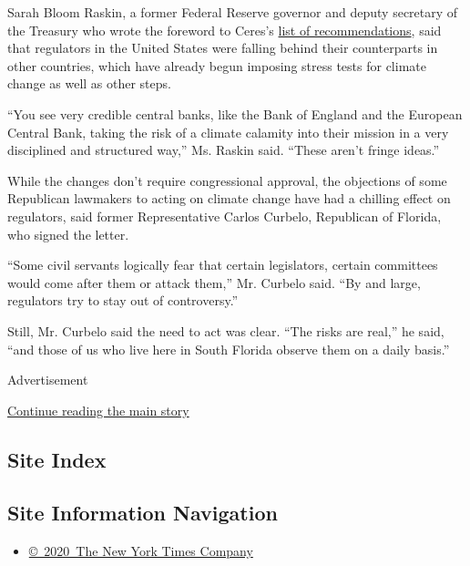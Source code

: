 Sarah Bloom Raskin, a former Federal Reserve governor and deputy
secretary of the Treasury who wrote the foreword to Ceres's
\href{https://www.ceres.org/resources/reports/addressing-climate-systemic-risk}{list
of recommendations}, said that regulators in the United States were
falling behind their counterparts in other countries, which have already
begun imposing stress tests for climate change as well as other steps.

``You see very credible central banks, like the Bank of England and the
European Central Bank, taking the risk of a climate calamity into their
mission in a very disciplined and structured way,'' Ms. Raskin said.
``These aren't fringe ideas.''

While the changes don't require congressional approval, the objections
of some Republican lawmakers to acting on climate change have had a
chilling effect on regulators, said former Representative Carlos
Curbelo, Republican of Florida, who signed the letter.

``Some civil servants logically fear that certain legislators, certain
committees would come after them or attack them,'' Mr. Curbelo said.
``By and large, regulators try to stay out of controversy.''

Still, Mr. Curbelo said the need to act was clear. ``The risks are
real,'' he said, ``and those of us who live here in South Florida
observe them on a daily basis.''

Advertisement

\protect\hyperlink{after-bottom}{Continue reading the main story}

\hypertarget{site-index}{%
\subsection{Site Index}\label{site-index}}

\hypertarget{site-information-navigation}{%
\subsection{Site Information
Navigation}\label{site-information-navigation}}

\begin{itemize}
\tightlist
\item
  \href{https://help.nytimes3xbfgragh.onion/hc/en-us/articles/115014792127-Copyright-notice}{©~2020~The
  New York Times Company}
\end{itemize}

